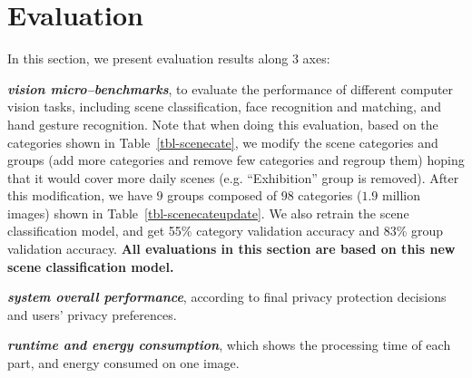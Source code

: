 \section{Evaluation}

In this section, we present evaluation results along $3$ axes:

\begin{inparaenum}[\itshape 1\itshape)]
\noindent\item \textit{\textbf{vision micro--benchmarks}}, to evaluate the performance of different computer vision tasks, including scene classification, face recognition and matching, and hand gesture recognition. Note that when doing this evaluation, based on the categories shown in Table~\ref{tbl-scenecate}, we modify the scene categories and groups (add more categories and remove few categories and regroup them) hoping that it would cover more daily scenes (e.g. ``Exhibition'' group is removed). After this modification, we have $9$ groups composed of $98$ categories ($1.9$ million images) shown in Table~\ref{tbl-scenecateupdate}. We also retrain the scene classification model, and get 55\% category validation accuracy and 83\% group validation accuracy. {\textbf{All evaluations in this section are based on this new scene classification model.}} \\
\item \textit{\textbf{system overall performance}}, according to final privacy protection decisions and users' privacy preferences.\\
\item \textit{\textbf{runtime and energy consumption}}, which shows the processing time of each part, and energy consumed on one image.\\
\end{inparaenum}


